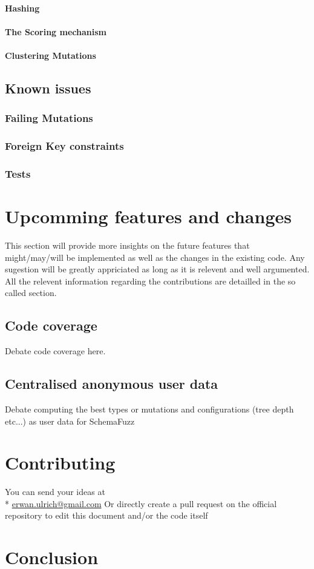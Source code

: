 \documentclass{article}
\begin{document}
				\paragraph{Hashing}
				\paragraph{The Scoring mechanism}
				\paragraph{Clustering Mutations}
		\subsection{Known issues}		
			\subsubsection{Failing Mutations}
			\subsubsection{Foreign Key constraints}
			\subsubsection{Tests}
	\section{Upcomming features and changes}
This section will provide more insights on the future features that might/may/will be implemented as well as the changes in the existing code.
Any sugestion will be greatly appriciated as long as it is relevent and well argumented. All the relevent information regarding the contributions are detailled in the so called section.
	
		\subsection{Code coverage}
Debate code coverage here.
		\subsection{Centralised anonymous user data}
Debate computing the best types or mutations and configurations (tree depth etc...) as user data for SchemaFuzz
		
	\section{Contributing}
You can send your ideas at  \\*
		\url{erwan.ulrich@gmail.com}
Or directly create a pull request on the official repository to edit this document and/or the code itself
	\section{Conclusion}
\end{document}
